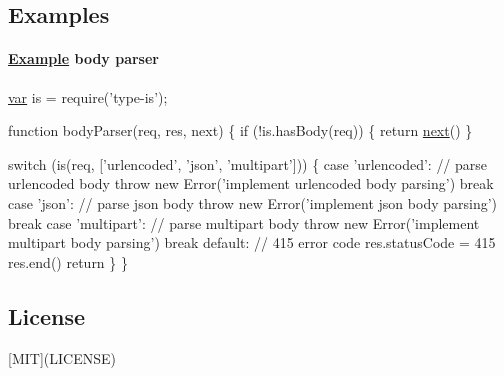 \subsection*{Examples}

\paragraph*{\hyperlink{struct_example}{Example} body parser}


\begin{DoxyCode}
\hyperlink{018__def_8c_a335628f2e9085305224b4f9cc6e95ed5}{var} is = require(\textcolor{stringliteral}{'type-is'});

\textcolor{keyword}{function} bodyParser(req, res, next) \{
  \textcolor{keywordflow}{if} (!is.hasBody(req)) \{
    \textcolor{keywordflow}{return} \hyperlink{057__caller__graphs_8tcl_a3f808a00e1b937978455d707851ab33a}{next}()
  \}

  \textcolor{keywordflow}{switch} (is(req, [\textcolor{stringliteral}{'urlencoded'}, \textcolor{stringliteral}{'json'}, \textcolor{stringliteral}{'multipart'}])) \{
    \textcolor{keywordflow}{case} \textcolor{stringliteral}{'urlencoded'}:
      \textcolor{comment}{// parse urlencoded body}
      \textcolor{keywordflow}{throw} \textcolor{keyword}{new} Error(\textcolor{stringliteral}{'implement urlencoded body parsing'})
      break
    case 'json':
      \textcolor{comment}{// parse json body}
      throw new Error('implement json body parsing')
      break
    case 'multipart':
      \textcolor{comment}{// parse multipart body}
      throw new Error('implement multipart body parsing')
      break
    default:
      \textcolor{comment}{// 415 error code}
      res.statusCode = 415
      res.end()
      return
  \}
\}
\end{DoxyCode}


\subsection*{License}

\mbox{[}M\+I\+T\mbox{]}(L\+I\+C\+E\+N\+S\+E) 